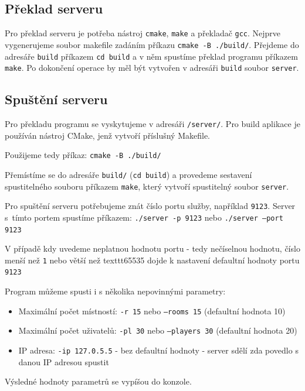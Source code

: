 \documentclass[12pt, a4paper]{article} %
\begin{document}
	\subsection{Překlad serveru}
	\par Pro překlad serveru je potřeba nástroj \texttt{cmake}, \texttt{make} a překladač \texttt{gcc}. Nejprve vygenerujeme soubor makefile zadáním příkazu \texttt{cmake -B ./build/}. Přejdeme do adresáře \texttt{build} příkazem \texttt{cd build} a v něm spustíme překlad programu příkazem \texttt{make}. Po dokončení operace by měl být vytvořen v adresáři \texttt{build} soubor \texttt{server}. 
	\subsection{Spuštění serveru}
	\par Pro překladu programu se vyskytujeme v adresáři \texttt{/server/}. Pro build aplikace je používán nástroj CMake, jenž vytvoří příslušný Makefile.\\
	\par Použijeme tedy příkaz: \texttt{cmake -B ./build/}\\
	\par Přemístíme se do adresáře \texttt{build/} (\texttt{cd build}) a provedeme sestavení spustitelného souboru příkazem \texttt{make}, který vytvoří spustitelný soubor \texttt{server}.
	\par Pro spuštění serveru potřebujeme znát číslo portu služby, například \texttt{9123}. Server s tímto portem spustíme příkazem:
	\texttt{./server -p 9123} nebo \texttt{./server --port 9123}\\
	\par V případě kdy uvedeme neplatnou hodnotu portu - tedy nečíselnou hodnotu, číslo menší než \texttt{1} nebo větší než texttt{65535} dojde k nastavení defaultní hodnoty portu \texttt{9123}\\
	\par Program můžeme spusti i s několika nepovinnými parametry:
	\begin{itemize}
		\item Maximální počet místností: \texttt{-r 15} nebo \texttt{--rooms 15}  (defaultní hodnota 10)
		\item Maximální počet uživatelů: \texttt{-pl 30} nebo \texttt{--players 30} (defaultní hodnota 20)
		\item IP adresa: \texttt{-ip 127.0.5.5} - bez defaultní hodnoty - server sdělí zda povedlo s danou IP adresou spustit
	\end{itemize}
	\par Výsledné hodnoty parametrů se vypíšou do konzole.
	
\end{document}
